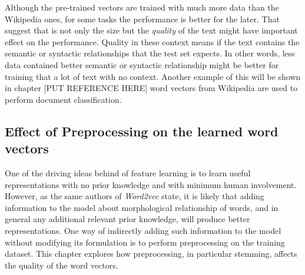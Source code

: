 Although the pre-trained vectors are trained with much more data
than the Wikipedia ones, for some tasks the performance is better for the
later. That suggest that is not only the size but the \textit{quality} of the
text might have important effect on the performance. Quality in these context
means if the text contains the semantic or syntactic relationships  that the
test set expects. In other words, less data contained better semantic or
syntactic relationship might be better for training that a lot of text with
no context. Another example of this will be shown in chapter [PUT REFERENCE
HERE] word vectors from Wikipedia are used to perform document classification.





\subsection{Effect of Preprocessing on the learned word vectors}
\label{sec:sub:effects_of_preprocessing_on_learned_word_vectors}

One of the driving ideas behind of feature learning is to learn useful
representations with no prior knowledge and with minimum human
involvement. However, as the same authors of \textit{Word2vec} state, it is likely
that adding information to the model about morphological relationship of
words, and in general any additional relevant prior knowledge,  will produce better
representations.  One way of indirectly adding such information to the model
without modifying its formulation is to perform preprocessing on the training
dataset. This chapter explores how preprocessing, in particular stemming,  affects the
quality of the word vectors. 
 

